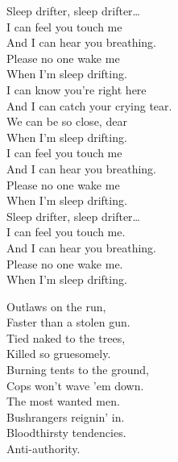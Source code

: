 Sleep drifter, sleep drifter… \\

I can feel you touch me \\
And I can hear you breathing. \\
Please no one wake me \\
When I'm sleep drifting. \\

I can know you're right here \\
And I can catch your crying tear. \\
We can be so close, dear \\
When I'm sleep drifting. \\

I can feel you touch me \\
And I can hear you breathing. \\
Please no one wake me \\
When I'm sleep drifting. \\

Sleep drifter, sleep drifter… \\

I can feel you touch me. \\
And I can hear you breathing. \\
Please no one wake me. \\
When I'm sleep drifting. \\





Outlaws on the run, \\
Faster than a stolen gun. \\
Tied naked to the trees, \\
Killed so gruesomely. \\

Burning tents to the ground, \\
Cops won't wave 'em down. \\
The most wanted men. \\
Bushrangers reignin' in. \\

Bloodthirsty tendencies. \\
Anti-authority. \\

